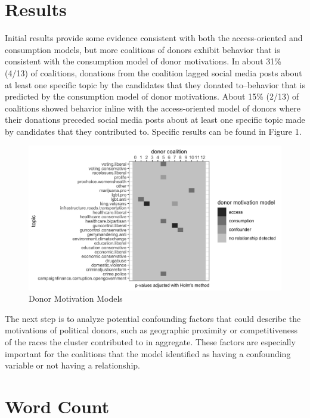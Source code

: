 \documentclass[12pt,]{article}
\begin{document}
\hypertarget{results}{%
\section{Results}\label{results}}

Initial results provide some evidence consistent with both the
access-oriented and consumption models, but more coalitions of donors
exhibit behavior that is consistent with the consumption model of donor
motivations. In about 31\% (4/13) of coalitions, donations from the
coalition lagged social media posts about at least one specific topic by
the candidates that they donated to--behavior that is predicted by the
consumption model of donor motivations. About 15\% (2/13) of coalitions
showed behavior inline with the access-oriented model of donors where
their donations preceded social media posts about at least one specific
topic made by candidates that they contributed to. Specific results can
be found in Figure 1.

\begin{figure}
\centering
\includegraphics{../tables_and_figures/aejmc_abstract_1.jpg}
\caption{Donor Motivation Models}
\end{figure}

The next step is to analyze potential confounding factors that could
describe the motivations of political donors, such as geographic
proximity or competitiveness of the races the cluster contributed to in
aggregate. These factors are especially important for the coalitions
that the model identified as having a confounding variable or not having
a relationship.

\hypertarget{word-count}{%
\section{Word Count}\label{word-count}}
\end{document}
